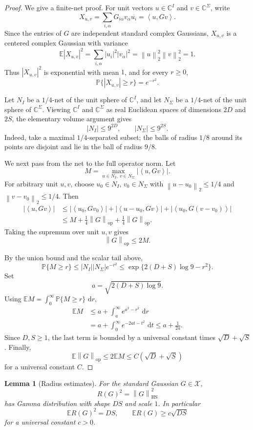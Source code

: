\documentclass[11pt,oneside]{book}
\newtheorem{lemma}[theorem]{Lemma}
\newcommand{\C}{\mathbb C}
\newcommand{\E}{\mathbb E}
\newcommand{\Prob}{\mathbb P}
\newcommand{\1}{\mathbf 1}
\newcommand{\HS}{\mathrm{HS}}
\newcommand{\op}{\mathrm{op}}
\newcommand{\dd}{\,\mathrm d}
\newcommand{\norm}[1]{\left\|#1\right\|}
\newcommand{\ip}[2]{\left\langle #1,#2\right\rangle}
\begin{document}
\begin{proof}
We give a finite-net proof.  For unit vectors \(u\in\C^I\) and
\(v\in\C^\Sigma\), write
\[
  X_{u,v}
  =
  \sum_{i,\alpha}G_{i\alpha}v_\alpha\overline{u_i}
  =
  \ip{u}{Gv}.
\]
Since the entries of \(G\) are independent standard complex Gaussians,
\(X_{u,v}\) is a centered complex Gaussian with variance
\[
  \E|X_{u,v}|^2
  =
  \sum_{i,\alpha}|u_i|^2|v_\alpha|^2
  =
  \norm u_2^2\norm v_2^2
  =
  1.
\]
Thus \(|X_{u,v}|^2\) is exponential with mean \(1\), and for every \(r\ge0\),
\[
  \Prob\{|X_{u,v}|\ge r\}=e^{-r^2}.
\]

Let \(N_I\) be a \(1/4\)-net of the unit sphere of \(\C^I\), and let
\(N_\Sigma\) be a \(1/4\)-net of the unit sphere of \(\C^\Sigma\).  Viewing
\(\C^I\) and \(\C^\Sigma\) as real Euclidean spaces of dimensions \(2D\) and
\(2S\), the elementary volume argument gives
\[
  |N_I|\le 9^{2D},\qquad |N_\Sigma|\le 9^{2S}.
\]
Indeed, take a maximal \(1/4\)-separated subset; the balls of radius \(1/8\)
around its points are disjoint and lie in the ball of radius \(9/8\).

We next pass from the net to the full operator norm.  Let
\[
  M=\max_{u\in N_I,\ v\in N_\Sigma}|\ip{u}{Gv}|.
\]
For arbitrary unit \(u,v\), choose \(u_0\in N_I\), \(v_0\in N_\Sigma\) with
\(\norm{u-u_0}_2\le1/4\) and \(\norm{v-v_0}_2\le1/4\).  Then
\[
\begin{aligned}
  |\ip{u}{Gv}|
  &\le
  |\ip{u_0}{Gv_0}|
  +
  |\ip{u-u_0}{Gv}|
  +
  |\ip{u_0}{G(v-v_0)}|        \\
  &\le
  M+\frac14\norm G_{\op}+\frac14\norm G_{\op}.
\end{aligned}
\]
Taking the supremum over unit \(u,v\) gives
\[
  \norm G_{\op}\le 2M.
\]

By the union bound and the scalar tail above,
\[
  \Prob\{M\ge r\}
  \le
  |N_I||N_\Sigma|e^{-r^2}
  \le
  \exp\{2(D+S)\log 9-r^2\}.
\]
Set
\[
  a=\sqrt{2(D+S)\log 9}.
\]
Using \(\E M=\int_0^\infty\Prob\{M\ge r\}\,\dd r\),
\[
\begin{aligned}
  \E M
  &\le
  a+\int_a^\infty e^{a^2-r^2}\,\dd r       \\
  &=
  a+\int_0^\infty e^{-2at-t^2}\,\dd t
  \le
  a+\frac1{2a}.
\end{aligned}
\]
Since \(D,S\ge1\), the last term is bounded by a universal constant times
\(\sqrt D+\sqrt S\).  Finally,
\[
  \E\norm G_{\op}\le 2\E M\le C(\sqrt D+\sqrt S)
\]
for a universal constant \(C\).
\end{proof}

\begin{lemma}[Radius estimates]
For the standard Gaussian \(G\in\mathcal X\),
\[
  R(G)^2=\norm G_{\HS}^2
\]
has Gamma distribution with shape \(DS\) and scale \(1\).  In particular
\[
  \E R(G)^2=DS,
  \qquad
  \E R(G)\ge c\sqrt{DS}
\]
for a universal constant \(c>0\).
\end{lemma}
\end{document}
